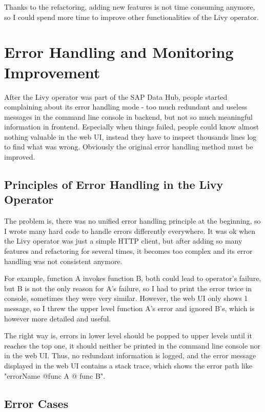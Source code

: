 \documentclass[article,colorback,accentcolor=tud4c]{tudreport}
\begin{document}
	Thanks to the refactoring, adding new features is not time consuming anymore, so I could spend more time to improve other functionalities of the Livy operator.
	
\newpage
	
\section{Error Handling and Monitoring Improvement}

\setcounter{table}{0}
\setcounter{figure}{0}

After the Livy operator was part of the SAP Data Hub, people started complaining about its error handling mode - too much redundant and useless messages in the command line console in backend, but not so much meaningful information in frontend. Especially when things failed, people could know almost nothing valuable in the web UI, instead they have to inspect thousands lines log to find what was wrong. Obviously the original error handling method must be improved.


	\subsection{Principles of Error Handling in the Livy Operator}
	
	The problem is, there was no unified error handling principle at the beginning, so I wrote many hard code to handle errors differently everywhere. It was ok when the Livy operator was just a simple HTTP client, but after adding so many features and refactoring for several times, it becomes too complex and its error handling was not consistent anymore. 
	
	For example, function A invokes function B, both could lead to operator's failure, but B is not the only reason for A's failure, so I had to print the error twice in console, sometimes they were very similar. However, the web UI only shows 1 message, so I threw the upper level function A's error and ignored B's, which is however more detailed and useful.
	
	The right way is, errors in lower level should be popped to upper levels until it reaches the top one, it should neither be printed in the command line console nor in the web UI. Thus, no redundant information is logged, and the error message displayed in the web UI contains a stack trace, which shows the error path like "errorName @func A @ func B".
	
	\subsection{Error Cases}
	
\end{document}
